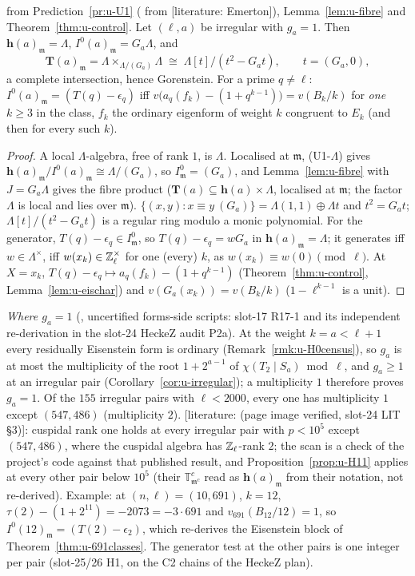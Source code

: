 \documentclass[11pt]{article}
\newcommand{\LIT}[1]{\textsf{[literature: #1]}}   %
\newcommand{\Iw}{\Lambda}                         %
\newcommand{\hcusp}{\mathbf{h}}                   %
\newcommand{\Tu}{\mathbf{T}}                      %
\newcommand{\ee}{\epsilon}                        %
\newcommand{\Zl}{\Z_\ell}
\begin{document}
\begin{proposition}\label{prop:u-H11}
\PROVED{} from Prediction~\ref{pr:u-U1} (\PROVED{} from \LIT{Emerton}), Lemma~\ref{lem:u-fibre} and Theorem~\ref{thm:u-control}. Let $(\ell,a)$ be irregular with $g_a=1$. Then
$\hcusp(a)_{\mathfrak m}=\Iw$, $I^{0}(a)_{\mathfrak m}=G_a\Iw$, and
\[
  \Tu(a)_{\mathfrak m}=\Iw\times_{\Iw/(G_a)}\Iw\;\cong\;\Iw[t]/(t^{2}-G_at),\qquad t=(G_a,0),
\]
a complete intersection, hence Gorenstein. For a prime $q\ne\ell$: $I^{0}(a)_{\mathfrak m}=(T(q)-\ee_q)$ iff $v\bigl(a_q(f_k)-(1+q^{k-1})\bigr)=v(B_k/k)$ for \emph{one} $k\ge3$ in
the class, $f_k$ the ordinary eigenform of weight $k$ congruent to $E_k$ (and then for every such $k$).
\end{proposition}

\begin{proof}
A local $\Iw$-algebra, free of rank $1$, is $\Iw$. Localised at $\mathfrak m$, (U1-$\Iw$) gives $\hcusp(a)_{\mathfrak m}/I^{0}(a)_{\mathfrak m}\cong\Iw/(G_a)$, so $I^{0}_{\mathfrak m}=(G_a)$,
and Lemma~\ref{lem:u-fibre} with $J=G_a\Iw$ gives the fibre product ($\Tu(a)\subseteq\hcusp(a)\times\Iw$, localised at $\mathfrak m$; the factor $\Iw$ is local and lies over
$\mathfrak m$). $\{(x,y):x\equiv y\ (G_a)\}=\Iw(1,1)\oplus\Iw t$ and $t^{2}=G_at$; $\Iw[t]/(t^{2}-G_at)$ is a regular ring modulo a monic polynomial. For the generator,
$T(q)-\ee_q\in I^{0}_{\mathfrak m}$, so $T(q)-\ee_q=wG_a$ in $\hcusp(a)_{\mathfrak m}=\Iw$; it generates iff $w\in\Iw^\times$, iff $w(x_k)\in\Zl^\times$ for one (every) $k$, as
$w(x_k)\equiv w(0)\pmod\ell$. At $X=x_k$, $T(q)-\ee_q\mapsto a_q(f_k)-(1+q^{k-1})$ (Theorem~\ref{thm:u-control}, Lemma~\ref{lem:u-eischar}) and
$v(G_a(x_k))=v(B_k/k)$ ($1-\ell^{k-1}$ is a unit).
\end{proof}

\noindent
\emph{Where $g_a=1$} (\COMP, uncertified forms-side scripts: slot-17 R17-1  and its independent re-derivation in the slot-24 HeckeZ audit P2a). At the weight
$k=a<\ell+1$ every residually Eisenstein form is ordinary (Remark~\ref{rmk:u-H0census}), so $g_a$ is at most the multiplicity of the root $1+2^{a-1}$ of $\chi(T_2\mid S_a)\bmod\ell$,
and $g_a\ge1$ at an irregular pair (Corollary~\ref{cor:u-irregular}); a multiplicity $1$ therefore proves $g_a=1$. Of the $155$ irregular pairs with $\ell<2000$, every one has
multiplicity $1$ except $(547,486)$ (multiplicity $2$). \LIT{\cite[\S1.1, arXiv v1, p.~2]{bellaiche_pollack} (page image verified, slot-24 LIT \S3)}: cuspidal rank one holds at every
irregular pair with $p<10^{5}$ except $(547,486)$, where the cuspidal algebra has $\Zl$-rank $2$; the scan is a check of the project's code against that published result, and
Proposition~\ref{prop:u-H11} applies at every other pair below $10^{5}$ (their $\mathbb T^{c}_{\mathfrak m^{c}}$ read as $\hcusp(a)_{\mathfrak m}$ from their notation, not
re-derived). Example: at $(n,\ell)=(10,691)$, $k=12$, $\tau(2)-(1+2^{11})=-2073=-3\cdot691$ and $v_{691}(B_{12}/12)=1$, so $I^{0}(12)_{\mathfrak m}=(T(2)-\ee_2)$, which re-derives the
Eisenstein block of Theorem~\ref{thm:u-691classes}. The generator test at the other pairs is one integer per pair (slot-25/26 H1, on the C2 chains of the HeckeZ plan).
\end{document}
